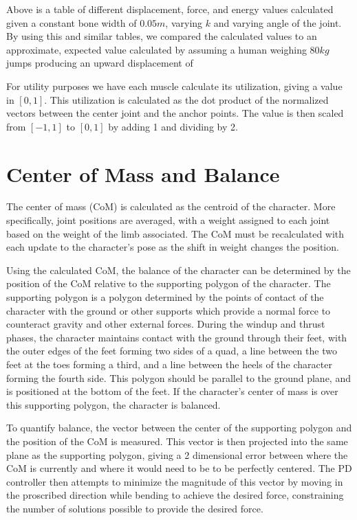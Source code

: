 \begin{table}[ht]
	\centering
	
	\caption[Table of estimated forces given $k$ values and joint angles]{Above is a table of different displacement, force, and energy values calculated given a constant bone width of $0.05m$, varying $k$ and varying angle of the joint.  By using this and similar tables, we compared the calculated values to an approximate, expected value calculated by assuming a human weighing $80kg$ jumps producing an upward displacement of }
	\label{tab:force_est}
\end{table}

For utility purposes we have each muscle calculate its utilization, giving a value in $[0,1]$.  This utilization is calculated as the dot product of the normalized vectors between the center joint and the anchor points.  The value is then scaled from $[-1, 1]$ to $[0,1]$ by adding 1 and dividing by 2.


\section{Center of Mass and Balance}
\label{section:com}
The center of mass (CoM) is calculated as the centroid of the character.  More specifically, joint positions are averaged, with a weight assigned to each joint based on the weight of the limb associated.  The CoM must be recalculated with each update to the character's pose as the shift in weight changes the position.

Using the calculated CoM, the balance of the character can be determined by the position of the CoM relative to the supporting polygon of the character.  The supporting polygon is a polygon determined by the points of contact of the character with the ground or other supports which provide a normal force to counteract gravity and other external forces.  During the windup and thrust phases, the character maintains contact with the ground through their feet, with the outer edges of the feet forming two sides of a quad, a line between the two feet at the toes forming a third, and a line between the heels of the character forming the fourth side.  This polygon should be parallel to the ground plane, and is positioned at the bottom of the feet.  If the character's center of mass is over this supporting polygon, the character is balanced.

To quantify balance, the vector between the center of the supporting polygon and the position of the CoM is measured.  This vector is then projected into the same plane as the supporting polygon, giving a 2 dimensional error between where the CoM is currently and where it would need to be to be perfectly centered.  The PD controller then attempts to minimize the magnitude of this vector by moving in the proscribed direction while bending to achieve the desired force, constraining the number of solutions possible to provide the desired force.

